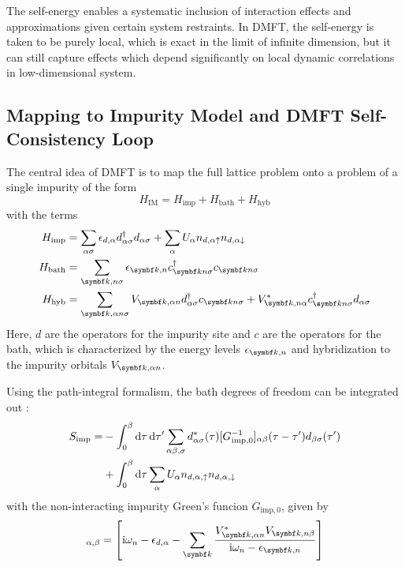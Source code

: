 \documentclass[../notes.tex]{subfiles}
\begin{document}
The self-energy enables a systematic inclusion of interaction effects and approximations given certain system restraints.
In DMFT, the self-energy is taken to be purely local, which is exact in the limit of infinite dimension, but it can still capture effects which depend significantly on local dynamic correlations in low-dimensional system.

\subsection*{Mapping to Impurity Model and DMFT Self-Consistency Loop}

The central idea of DMFT is to map the full lattice problem onto a problem of a single impurity of the form
\begin{equation}
	H_{\mathrm{IM}} = H_{\mathrm{imp}} + H_{\mathrm{bath}} + H_{\mathrm{hyb}}
\end{equation}
with the terms
\begin{align}
	H_{\mathrm{imp}} &= \sum_{\alpha \sigma} \epsilon_{d, \alpha} d_{\alpha \sigma}^{\dagger} d_{\alpha \sigma} + \sum_{\alpha} U_{\alpha} n_{d, \alpha \uparrow} n_{d, \alpha \downarrow} \\
	H_{\mathrm{bath}} &= \sum_{\vb{k}, n \sigma} \epsilon_{\vb{k}, n} c_{\vb{k} n \sigma}^{\dagger} c_{\vb{k} n \sigma}  \\
	H_{\mathrm{hyb}} &= \sum_{\vb{k}, \alpha n \sigma} V_{\vb{k}, \alpha n} d_{\alpha \sigma}^{\dagger} c_{\vb{k} n \sigma} + V_{\vb{k}, n \alpha}^* c_{\vb{k} n \sigma}^{\dagger} d_{\alpha \sigma}
\end{align}
Here, \(d\) are the operators for the impurity site and \(c\) are the operators for the bath, which is characterized by the energy levels \(\epsilon_{\vb{k}, n}\) and hybridization to the impurity orbitals \(V_{\vb{k}, \alpha n}\).

Using the path-integral formalism, the bath degrees of freedom can be integrated out \cite{georgesDynamicalMeanfieldTheory1996}:
\begin{align}
	S_{\mathrm{imp}} = &-\int_{0}^{\beta} \odif{\tau} \odif{\tau^{\prime}} \sum_{\alpha \beta, \sigma} d^*_{\alpha \sigma} (\tau) [G_{\mathrm{imp}, 0}^{-1}]_{\alpha \beta} (\tau - \tau^{\prime}) d_{\beta \sigma} (\tau^{\prime}) \\
	&+ \int_{0}^{\beta} \odif{\tau} \sum_{\alpha} U_{\alpha} n_{d, \alpha, \uparrow} n_{d, \alpha, \downarrow}
\end{align}
with the non-interacting impurity Green's funcion \(G_{\mathrm{imp}, 0}\), given by
\begin{equation}
	[G_{\mathrm{imp}, 0}]_{\alpha, \beta} = \left[\iu \omega_n - \epsilon_{d, \alpha} - \sum_{\vb{k}} \frac{V_{\vb{k}, \alpha n}^* V_{\vb{k}, n \beta}}{\iu \omega_n - \epsilon_{\vb{k}, n}} \right]
\end{equation}
\end{document}
